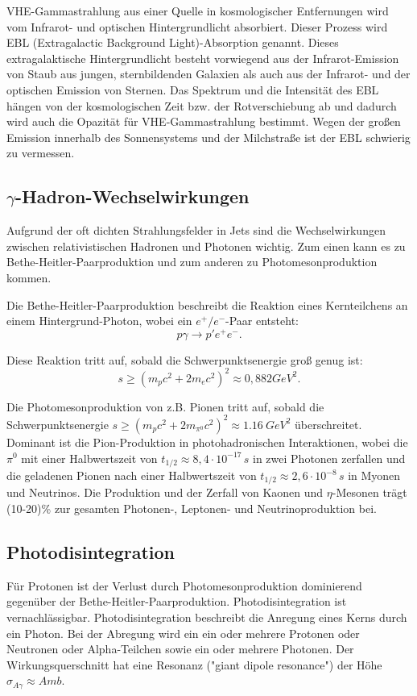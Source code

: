 VHE-Gammastrahlung aus einer Quelle in kosmologischer Entfernungen wird vom Infrarot- und optischen Hintergrundlicht absorbiert. 
Dieser Prozess wird EBL (Extragalactic Background Light)-Absorption genannt. 
Dieses extragalaktische Hintergrundlicht besteht vorwiegend aus der Infrarot-Emission von Staub aus jungen, sternbildenden Galaxien als auch aus der Infrarot- und der optischen Emission von Sternen.
Das Spektrum und die Intensität des EBL hängen von der kosmologischen Zeit bzw. der Rotverschiebung ab und dadurch wird auch die Opazität für VHE-Gammastrahlung bestimmt.
Wegen der großen Emission innerhalb des Sonnensystems und der Milchstraße ist der EBL schwierig zu vermessen.\cite{RelativisticJets}


\subsection{$\gamma$-Hadron-Wechselwirkungen}
Aufgrund der oft dichten Strahlungsfelder in Jets sind die Wechselwirkungen zwischen relativistischen Hadronen und Photonen wichtig.
Zum einen kann es zu Bethe-Heitler-Paarproduktion und zum anderen zu Photomesonproduktion kommen.\cite{RelativisticJets}

Die Bethe-Heitler-Paarproduktion beschreibt die Reaktion eines Kernteilchens an einem Hintergrund-Photon, wobei ein $e^+/e^-$-Paar entsteht:
\begin{equation}
 p \gamma \rightarrow p' e^+ e^-.
\end{equation}

Diese Reaktion tritt auf, sobald die Schwerpunktsenergie groß genug ist:
\begin{equation}
 s \geq (m_p c^2 +2 m_e c^2)^2 \approx 0,882\si{GeV^2}.
\end{equation}

Die Photomesonproduktion von z.B. Pionen tritt auf, sobald die Schwerpunktsenergie $s \geq (m_p c^2 +2 m_{\pi^0} c^2)^2 \approx \SI{1,16}{GeV^2}$ überschreitet.
Dominant ist die Pion-Produktion in photohadronischen Interaktionen, wobei die $\pi^0$ mit einer Halbwertszeit von $t_{1/2}\approx 8,4\cdot 10^{-17}\,\si{s}$ in zwei Photonen zerfallen und die geladenen Pionen nach einer Halbwertszeit von $t_{1/2}\approx 2,6\cdot 10^{-8}\,\si{s}$ in Myonen und Neutrinos.
Die Produktion und der Zerfall von Kaonen und $\eta$-Mesonen trägt (10-20)\% zur gesamten Photonen-, Leptonen- und Neutrinoproduktion bei.\cite{RelativisticJets}

\subsection{Photodisintegration}
Für Protonen ist der Verlust durch Photomesonproduktion dominierend gegenüber der Bethe-Heitler-Paarproduktion. 
Photodisintegration ist vernachlässigbar.
Photodisintegration beschreibt die Anregung eines Kerns durch ein Photon.
Bei der Abregung wird ein ein oder mehrere Protonen oder Neutronen oder Alpha-Teilchen sowie ein oder mehrere Photonen.
Der Wirkungsquerschnitt hat eine Resonanz ("giant dipole resonance") der Höhe $\sigma_{A\gamma}\approx A \si{mb}$.\cite{RelativisticJets}

